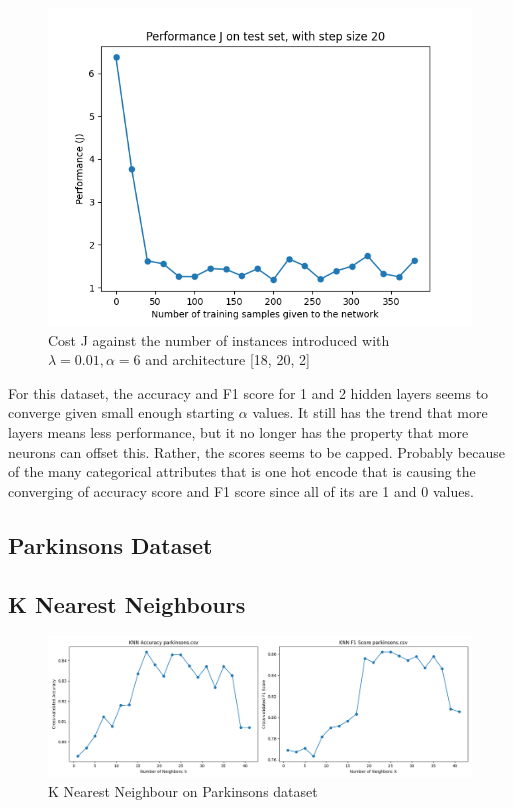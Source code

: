 \documentclass[letterpaper]{article}
\begin{document}
\begin{figure}[H]
	\includegraphics[width=\textwidth]{figures/nn_loan.csv_cost.png}
	\caption{Cost J against the number of instances introduced with $\lambda=0.01, \alpha=6$ and architecture [18, 20, 2]}
	\label{fig:nn-loan}
\end{figure}

For this dataset, the accuracy and F1 score for 1 and 2 hidden layers seems to converge given small enough starting $\alpha$ values. It still has the
trend that more layers means less performance, but it no longer has the property that more neurons can offset this. Rather, the scores seems to be
capped. Probably because of the many categorical attributes that is one hot encode that is causing the converging of accuracy score and F1 score
since all of its are 1 and 0 values.

\subsection{Parkinsons Dataset}
\subsection*{K Nearest Neighbours}
\begin{figure}[H]
	\includegraphics[width=\textwidth]{figures/knn_parkinsons.csv.png}
	\caption{K Nearest Neighbour on Parkinsons dataset}
	\label{fig:knn-parkinsons}
\end{figure}
\end{document}
